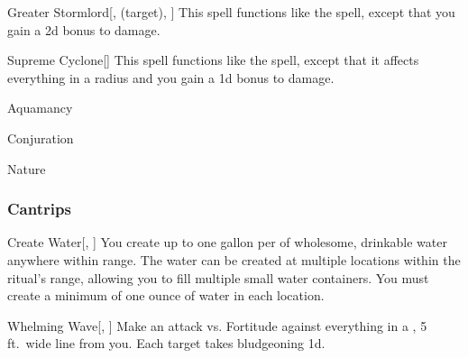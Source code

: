\lowercase{\hypertarget{spell:Greater Stormlord}{}}\label{spell:Greater Stormlord}
\begin{attuneability}[\nth{6}]{\hypertarget{spell:Greater Stormlord}{Greater Stormlord}}[,  (target), ]
This spell functions like the  spell, except that you gain a \plus2d bonus to damage.
\end{attuneability}
\vspace{0.25em}



\lowercase{\hypertarget{spell:Supreme Cyclone}{}}\label{spell:Supreme Cyclone}
\begin{apability}[\nth{6}]{\hypertarget{spell:Supreme Cyclone}{Supreme Cyclone}}[]
This spell functions like the  spell, except that it affects everything in a \arealarge radius and you gain a \plus1d bonus to damage.
\end{apability}
\vspace{0.25em}


\newpage
\begin{spellsection}{Aquamancy}

\begin{spellheader}
\end{spellheader}


 Conjuration

 Nature

\subsubsection{Cantrips}


\lowercase{\hypertarget{spell:Create Water}{}}\label{spell:Create Water}
\begin{freeability}[\nth{1}]{\hypertarget{spell:Create Water}{Create Water}}[, ]
You create up to one gallon per  of wholesome, drinkable water anywhere within \rngclose range.
The water can be created at multiple locations within the ritual's range, allowing you to fill multiple small water containers.
You must create a minimum of one ounce of water in each location.
\end{freeability}
\vspace{0.25em}



\begin{freeability}{Whelming Wave}[, ]
Make an attack vs. Fortitude against everything in a \areamed, 5 ft.\ wide line from you.
\hit Each target takes bludgeoning  \minus1d.
\end{freeability}

\end{spellsection}


